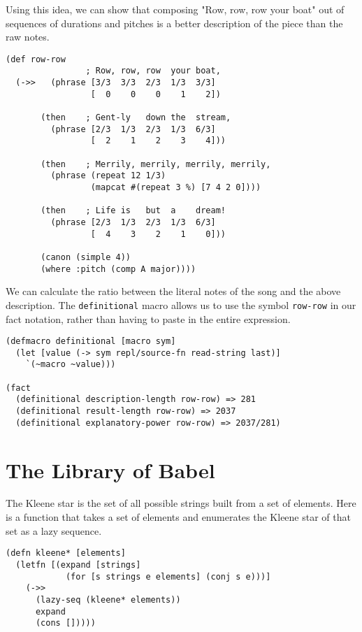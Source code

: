 \documentclass[numbers]{sigplanconf}
\begin{document}
Using this idea, we can show that composing "Row, row, row your boat" out of sequences of durations and pitches
is a better description of the piece than the raw notes.

\begin{verbatim}
(def row-row
                ; Row, row, row  your boat,
  (->>   (phrase [3/3  3/3  2/3  1/3  3/3]
                 [  0    0    0    1    2])

       (then    ; Gent-ly   down the  stream,
         (phrase [2/3  1/3  2/3  1/3  6/3]
                 [  2    1    2    3    4]))

       (then    ; Merrily, merrily, merrily, merrily,
         (phrase (repeat 12 1/3)
                 (mapcat #(repeat 3 %) [7 4 2 0])))

       (then    ; Life is   but  a    dream!
         (phrase [2/3  1/3  2/3  1/3  6/3]
                 [  4    3    2    1    0]))

       (canon (simple 4))
       (where :pitch (comp A major))))
\end{verbatim}

We can calculate the ratio between the literal notes of the song and the above description.
The \verb|definitional| macro allows us to use the symbol \verb|row-row| in our fact notation, rather than
having to paste in the entire expression.

\begin{verbatim}
(defmacro definitional [macro sym]
  (let [value (-> sym repl/source-fn read-string last)]
    `(~macro ~value)))

(fact
  (definitional description-length row-row) => 281
  (definitional result-length row-row) => 2037
  (definitional explanatory-power row-row) => 2037/281)
\end{verbatim}

\section{The Library of Babel}

The Kleene star is the set of all possible strings built from a set of elements. Here is a function that takes a set of
elements and enumerates the Kleene star of that set as a lazy sequence.

\begin{verbatim}
(defn kleene* [elements]
  (letfn [(expand [strings]
            (for [s strings e elements] (conj s e)))]
    (->>
      (lazy-seq (kleene* elements))
      expand
      (cons []))))
\end{verbatim}
\end{document}
